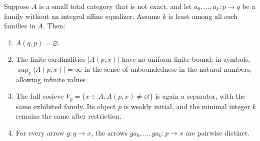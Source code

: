 \begin{proposition}\label{FT:minimal-family}
Suppose $A$ is a small total category that is not exact, and let
$a_0,\ldots,a_k:p\to q$ be a family without an integral affine equalizer.
Assume $k$ is least among all such families in $A$. Then:
\begin{enumerate}
\item $A(q,p)=\varnothing$.
\item The finite cardinalities $|A(p,x)|$ have no uniform finite bound;
in symbols, $\sup_x|A(p,x)|=\infty$ in the sense of unboundedness in the
natural numbers, allowing infinite values.
\item The full cosieve
$V_p=\{x\in A:A(p,x)\ne\varnothing\}$ is again a separator, with the
same exhibited family. Its object $p$ is weakly initial, and the minimal
integer $k$ remains the same after restriction.
\item For every arrow $g:q\to x$, the arrows
$ga_0,\ldots,ga_k:p\to x$ are pairwise distinct.
\end{enumerate}
\end{proposition}
